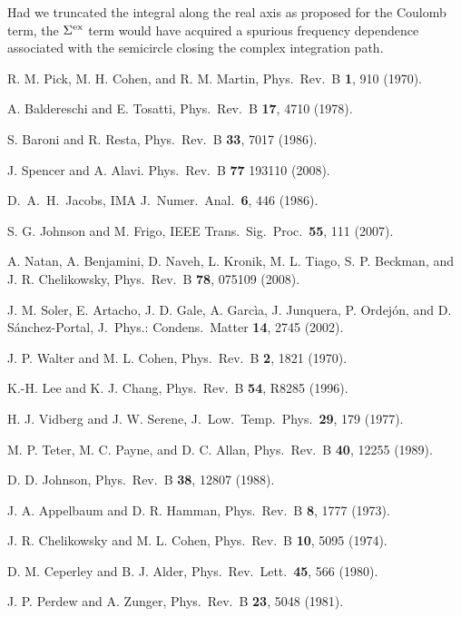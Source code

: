 \documentclass[twocolumn,prb,showpacs,superscriptaddress]{revtex4}
\begin{document}
\begin{thebibliography}{99}
Had we truncated the integral along the real axis as proposed for the Coulomb term, 
the $\Sigma^{\rm ex}$ term would have acquired a spurious frequency dependence associated with
the semicircle closing the complex integration path.

R. M. Pick, M. H. Cohen, and R. M. Martin,
Phys.\ Rev.\ B {\bf 1}, 910 (1970). 

A. Baldereschi and E. Tosatti,
Phys.\ Rev.\ B {\bf 17}, 4710 (1978).

S. Baroni and R. Resta,
Phys.\ Rev.\ B {\bf 33}, 7017 (1986).

J. Spencer and A. Alavi.
Phys.\ Rev.\ B {\bf 77} 193110 (2008).

D.\ A.\ H.\ Jacobs,
IMA J.\ Numer.\ Anal.\ {\bf 6}, 446 (1986).

S. G. Johnson and M. Frigo,
IEEE Trans.\ Sig.\ Proc.\ {\bf 55}, 111 (2007).

A. Natan, A. Benjamini, D. Naveh, L. Kronik, M. L. Tiago, S. P. Beckman, and J. R. Chelikowsky,
Phys.\ Rev.\ B {\bf 78}, 075109 (2008).

J. M. Soler, E. Artacho, J. D. Gale, A. Garc\`ia, J. Junquera, P. Ordej\'on, and D. S\'anchez-Portal,
J.\ Phys.: Condens.\ Matter {\bf 14}, 2745 (2002).

J. P. Walter and M. L. Cohen,
Phys.\ Rev.\ B {\bf 2}, 1821 (1970).

K.-H. Lee and K. J. Chang,
Phys.\ Rev.\ B {\bf 54}, R8285 (1996).

H. J. Vidberg and J. W. Serene,
J.\ Low.\ Temp.\ Phys.\ {\bf 29}, 179 (1977).

M. P. Teter, M. C. Payne, and D. C. Allan,
Phys.\ Rev.\ B {\bf 40}, 12255 (1989).

D. D. Johnson, 
Phys.\ Rev.\ B {\bf 38}, 12807 (1988).

J. A. Appelbaum and D. R. Hamman, 
Phys.\ Rev.\ B {\bf 8}, 1777 (1973).

J. R. Chelikowsky and M. L. Cohen,
Phys.\ Rev.\ B {\bf 10}, 5095 (1974).

D. M. Ceperley and B. J. Alder,
Phys.\ Rev.\ Lett.\ {\bf 45}, 566 (1980).

J. P. Perdew and A. Zunger,
Phys.\ Rev.\ B {\bf 23}, 5048 (1981).


\end{thebibliography}
\end{document}
